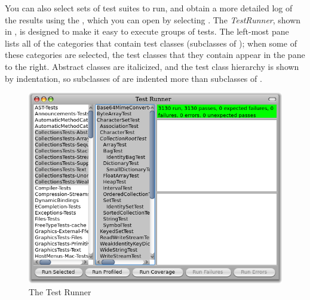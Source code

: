 \documentclass[a4paper,10pt,twoside]{book}
\begin{document}
You can also select sets of test suites to run, and obtain a more detailed log of the results using the \sunit {}, which you can open by selecting .
The \emph{TestRunner}, shown in , is designed to make it easy  to execute groups of tests.
The left-most pane lists all of the categories that contain test classes (\ie  subclasses of ); when some of these categories are selected, the test classes that they contain appear in the pane to the right.
Abstract classes are italicized, and the test class hierarchy is shown by indentation, so subclasses of  are indented more than subclasses of .

\begin{figure}[tbh]
  \begin{center}
	\includegraphics[width=\linewidth]{test-runner}
	\caption{The \pharo \sunit Test Runner}
	\label{fig:test-runner}
  \end{center}
\end{figure}



\end{document}
